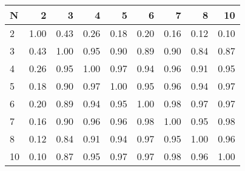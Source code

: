 \begin{tabular}{lrrrrrrrr}
\toprule
N &    2  &    3  &    4  &    5  &    6  &    7  &    8  &    10 \\
\midrule
2  &  1.00 &  0.43 &  0.26 &  0.18 &  0.20 &  0.16 &  0.12 &  0.10 \\
3  &  0.43 &  1.00 &  0.95 &  0.90 &  0.89 &  0.90 &  0.84 &  0.87 \\
4  &  0.26 &  0.95 &  1.00 &  0.97 &  0.94 &  0.96 &  0.91 &  0.95 \\
5  &  0.18 &  0.90 &  0.97 &  1.00 &  0.95 &  0.96 &  0.94 &  0.97 \\
6  &  0.20 &  0.89 &  0.94 &  0.95 &  1.00 &  0.98 &  0.97 &  0.97 \\
7  &  0.16 &  0.90 &  0.96 &  0.96 &  0.98 &  1.00 &  0.95 &  0.98 \\
8  &  0.12 &  0.84 &  0.91 &  0.94 &  0.97 &  0.95 &  1.00 &  0.96 \\
10 &  0.10 &  0.87 &  0.95 &  0.97 &  0.97 &  0.98 &  0.96 &  1.00 \\
\bottomrule
\end{tabular}
